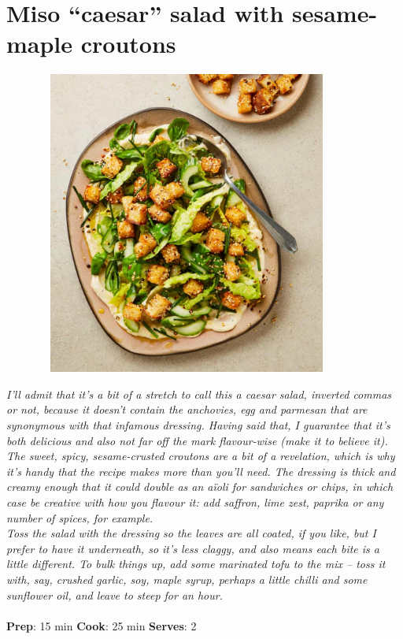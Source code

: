 \documentclass{book}
\begin{document}
\section{Miso “caesar” salad with sesame-maple croutons}
\begin{figure}
\centering\includegraphics[width=10cm,height=10cm,keepaspectratio]{Recipe_Pictures/Miso_caesar_salad_with_sesame-maple_croutons.png}
\end{figure}
\emph{I’ll admit that it’s a bit of a stretch to call this a caesar salad, inverted commas or not, because it doesn’t contain the anchovies, egg and parmesan that are synonymous with that infamous dressing. Having said that, I guarantee that it’s both delicious and also not far off the mark flavour-wise (make it to believe it). The sweet, spicy, sesame-crusted croutons are a bit of a revelation, which is why it’s handy that the recipe makes more than you’ll need. The dressing is thick and creamy enough that it could double as an aïoli for sandwiches or chips, in which case be creative with how you flavour it: add saffron, lime zest, paprika or any number of spices, for example.\\ 
Toss the salad with the dressing so the leaves are all coated, if you like, but I prefer to have it underneath, so it’s less claggy, and also means each bite is a little different. To bulk things up, add some marinated tofu to the mix – toss it with, say, crushed garlic, soy, maple syrup, perhaps a little chilli and some sunflower oil, and leave to steep for an hour.}\\\\ 
\textbf{Prep}: 15 min
\textbf{Cook}: 25 min
\textbf{Serves}: 2
\end{document}
